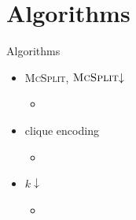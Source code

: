 \documentclass{beamer}
\begin{document}
\section{Algorithms}

\begin{frame}{Algorithms}
  \begin{itemize}
  \item \textsc{McSplit}, $\textsc{McSplit}{\downarrow}$
    \begin{itemize}
    \item \cite{DBLP:conf/ijcai/McCreeshPT17}
    \end{itemize}
  \item clique encoding
    \begin{itemize}
    \item \cite{DBLP:conf/cp/McCreeshNPS16}
    \end{itemize}
  \item $k{\downarrow}$
    \begin{itemize}
    \item \cite{DBLP:conf/aaai/HoffmannMR17}
    \end{itemize}
  \end{itemize}
\end{frame}
\end{document}
